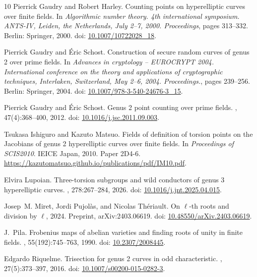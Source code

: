 \documentclass[11pt,a4paper]{article}
\theoremstyle{plain}
\theoremstyle{definition}
\theoremstyle{remark}
\begin{document}
\begin{thebibliography}{10}
Pierrick Gaudry and Robert Harley.
\newblock Counting points on hyperelliptic curves over finite fields.
\newblock In {\em Algorithmic number theory. 4th international symposium.
  ANTS-IV, Leiden, the Netherlands, July 2--7, 2000. Proceedings}, pages
  313--332. Berlin: Springer, 2000.
\newblock doi:
  \href{https://doi.org/10.1007/10722028_18}{10.1007/10722028\_18}.

Pierrick Gaudry and {\'E}ric Schost.
\newblock Construction of secure random curves of genus 2 over prime fields.
\newblock In {\em Advances in cryptology -- EUROCRYPT 2004. International
  conference on the theory and applications of cryptographic techniques,
  Interlaken, Switzerland, May 2--6, 2004. Proceedings.}, pages 239--256.
  Berlin: Springer, 2004.
\newblock doi:
  \href{https://doi.org/10.1007/978-3-540-24676-3_15}{10.1007/978-3-540-24676-3\_15}.

Pierrick Gaudry and {\'E}ric Schost.
\newblock Genus 2 point counting over prime fields.
, 47(4):368--400, 2012.
\newblock doi:
  \href{https://doi.org/10.1016/j.jsc.2011.09.003}{10.1016/j.jsc.2011.09.003}.

Tsukasa Ishiguro and Kazuto Matsuo.
\newblock Fields of definition of torsion points on the {Jacobians} of genus 2
  hyperelliptic curves over finite fields.
\newblock In {\em Proceedings of SCIS2010}. IEICE Japan, 2010.
\newblock Paper 2D4-6.
  \url{https://kazutomatsuo.github.io/publications/pdf/IM10.pdf}.

Elvira Lupoian.
\newblock Three-torsion subgroups and wild conductors of genus 3 hyperelliptic
  curves.
, 278:267--284, 2026.
\newblock doi:
  \href{https://doi.org/10.1016/j.jnt.2025.04.015}{10.1016/j.jnt.2025.04.015}.

Josep~M. Miret, Jordi Pujol{\`a}s, and Nicolas Thériault.
\newblock On {$\ell$}-th roots and division by {$\ell$}, 2024.
\newblock Preprint, arXiv:2403.06619. doi:
  \href{https://doi.org/10.48550/arXiv.2403.06619}{10.48550/arXiv.2403.06619}.

J.~Pila.
\newblock Frobenius maps of abelian varieties and finding roots of unity in
  finite fields.
, 55(192):745--763, 1990.
\newblock doi: \href{https://doi.org/10.2307/2008445}{10.2307/2008445}.

Edgardo Riquelme.
\newblock Trisection for genus 2 curves in odd characteristic.
, 27(5):373--397, 2016.
\newblock doi:
  \href{https://doi.org/10.1007/s00200-015-0282-3}{10.1007/s00200-015-0282-3}.


\end{thebibliography}
\end{document}
